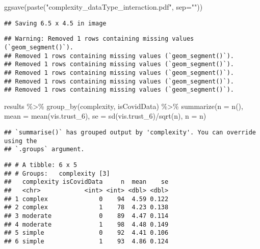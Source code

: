 \documentclass[
]{article}
\newenvironment{Shaded}{\begin{snugshade}}{\end{snugshade}}
\newcommand{\AttributeTok}[1]{\textcolor[rgb]{0.77,0.63,0.00}{#1}}
\newcommand{\FunctionTok}[1]{\textcolor[rgb]{0.00,0.00,0.00}{#1}}
\newcommand{\NormalTok}[1]{#1}
\newcommand{\SpecialCharTok}[1]{\textcolor[rgb]{0.00,0.00,0.00}{#1}}
\newcommand{\StringTok}[1]{\textcolor[rgb]{0.31,0.60,0.02}{#1}}
\begin{document}
\begin{Shaded}
\begin{Highlighting}[]
\FunctionTok{ggsave}\NormalTok{(}\FunctionTok{paste}\NormalTok{(}\StringTok{"complexity\_dataType\_interaction.pdf"}\NormalTok{, }\AttributeTok{sep=}\StringTok{""}\NormalTok{))}
\end{Highlighting}
\end{Shaded}

\begin{verbatim}
## Saving 6.5 x 4.5 in image
\end{verbatim}

\begin{verbatim}
## Warning: Removed 1 rows containing missing values (`geom_segment()`).
## Removed 1 rows containing missing values (`geom_segment()`).
## Removed 1 rows containing missing values (`geom_segment()`).
## Removed 1 rows containing missing values (`geom_segment()`).
## Removed 1 rows containing missing values (`geom_segment()`).
## Removed 1 rows containing missing values (`geom_segment()`).
\end{verbatim}

\begin{Shaded}
\begin{Highlighting}[]
\NormalTok{results }\SpecialCharTok{\%\textgreater{}\%}
  \FunctionTok{group\_by}\NormalTok{(complexity, isCovidData) }\SpecialCharTok{\%\textgreater{}\%}
  \FunctionTok{summarize}\NormalTok{(}\AttributeTok{n =} \FunctionTok{n}\NormalTok{(),}
            \AttributeTok{mean =} \FunctionTok{mean}\NormalTok{(vis.trust\_6),}
            \AttributeTok{se =} \FunctionTok{sd}\NormalTok{(vis.trust\_6)}\SpecialCharTok{/}\FunctionTok{sqrt}\NormalTok{(n),}
            \AttributeTok{n =}\NormalTok{ n)}
\end{Highlighting}
\end{Shaded}

\begin{verbatim}
## `summarise()` has grouped output by 'complexity'. You can override using the
## `.groups` argument.
\end{verbatim}

\begin{verbatim}
## # A tibble: 6 x 5
## # Groups:   complexity [3]
##   complexity isCovidData     n  mean    se
##   <chr>            <int> <int> <dbl> <dbl>
## 1 complex              0    94  4.59 0.122
## 2 complex              1    78  4.23 0.138
## 3 moderate             0    89  4.47 0.114
## 4 moderate             1    98  4.48 0.149
## 5 simple               0    92  4.41 0.106
## 6 simple               1    93  4.86 0.124
\end{verbatim}
\end{document}
